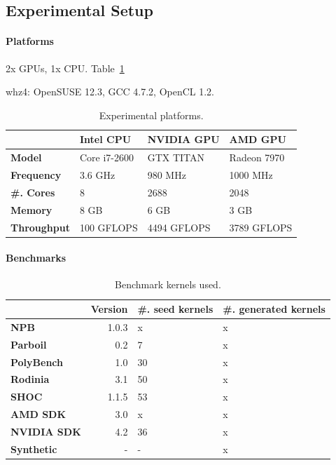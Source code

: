 \documentclass[preprint,nonatbib,10pt,nocopyrightspace]{sigplanconf}
\begin{document}
\subsection{Experimental Setup}\label{subsec:}

\paragraph{Platforms} 2x GPUs, 1x CPU. Table~\ref{tab:platforms}

whz4: OpenSUSE 12.3, GCC 4.7.2, OpenCL 1.2.

\begin{table}%
\scriptsize
\centering
\begin{tabular}{l l l l}
  \toprule
  & \textbf{Intel CPU} & \textbf{NVIDIA GPU} & \textbf{AMD GPU} \\
  \midrule
  \textbf{Model} & Core i7-2600 & GTX TITAN & Radeon 7970 \\
  \textbf{Frequency} & 3.6 GHz & 980 MHz & 1000 MHz \\
  \textbf{\#. Cores} & 8 & 2688 & 2048 \\
  \textbf{Memory} & 8 GB & 6 GB & 3 GB \\
  \textbf{Throughput} & 100 GFLOPS & 4494 GFLOPS & 3789 GFLOPS \\
  \bottomrule
\end{tabular}
\caption{Experimental platforms.}
\label{tab:platforms}
\end{table}


\paragraph{Benchmarks}

\begin{table}%
\scriptsize
\centering
\begin{tabular}{l r R{2cm} R{2cm}}
  \toprule
  & \textbf{Version} & \textbf{\#. seed kernels} & \textbf{\#. generated kernels}\\
  \midrule
  \textbf{NPB~\cite{Seo2011}} & 1.0.3 & x & x \\
  \textbf{Parboil~\cite{Stratton2012}} & 0.2 & 7 & x \\
  \textbf{PolyBench~\cite{Grauer-Gray2012}} & 1.0 & 30 & x \\
  \textbf{Rodinia~\cite{Che2009}} & 3.1 & 50 & x \\
  \textbf{SHOC~\cite{Danalis2010}} & 1.1.5 & 53 & x \\
  \textbf{AMD SDK} & 3.0 & x & x \\
  \textbf{NVIDIA SDK} & 4.2 & 36 & x \\
  \textbf{Synthetic} & - & - & x \\
  \bottomrule
\end{tabular}
\caption{%
  Benchmark kernels used.
}
\label{tab:benchmarks}
\end{table}
\end{document}
